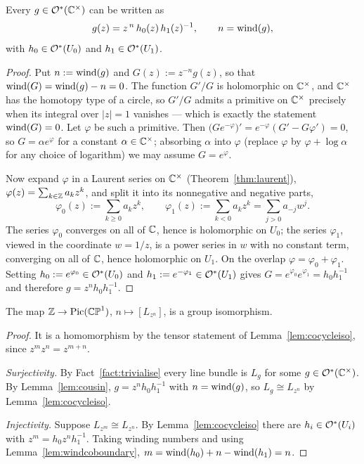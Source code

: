\begin{smjlemma}\label{lem:cousin}
Every $g \in \mathcal{O}^\ast(\mathbb{C}^\times)$ can be written as
\[
g(z) = z^{\,n}\, h_0(z)\, h_1(z)^{-1}, \qquad n = \operatorname{wind}(g),
\]
with $h_0 \in \mathcal{O}^\ast(U_0)$ and $h_1 \in \mathcal{O}^\ast(U_1)$.
\end{smjlemma}

\begin{proof}
Put $n := \operatorname{wind}(g)$ and $G(z) := z^{-n}g(z)$, so that $\operatorname{wind}(G) = \operatorname{wind}(g) - n =
0$. The function $G'/G$ is holomorphic on $\mathbb{C}^\times$, and $\mathbb{C}^\times$ has the
homotopy type of a circle, so $G'/G$ admits a primitive on $\mathbb{C}^\times$ precisely
when its integral over $|z| = 1$ vanishes \cite[Ch.~4]{Ahlfors} --- which is
exactly the statement $\operatorname{wind}(G) = 0$. Let $\varphi$ be such a primitive. Then
$\big(Ge^{-\varphi}\big)' = e^{-\varphi}(G' - G\varphi') = 0$, so
$G = \alpha e^{\varphi}$ for a constant $\alpha \in \mathbb{C}^\times$; absorbing
$\alpha$ into $\varphi$ (replace $\varphi$ by $\varphi + \log\alpha$ for any
choice of logarithm) we may assume $G = e^{\varphi}$.

Now expand $\varphi$ in a Laurent series on $\mathbb{C}^\times$
(Theorem~\ref{thm:laurent}), $\varphi(z) = \sum_{k \in \mathbb{Z}} a_k z^k$, and split
it into its nonnegative and negative parts,
\[
\varphi_0(z) := \sum_{k \geq 0} a_k z^{k}, \qquad
\varphi_1(z) := \sum_{k < 0} a_k z^{k} = \sum_{j > 0} a_{-j} w^{j} .
\]
The series $\varphi_0$ converges on all of $\mathbb{C}$, hence is holomorphic on $U_0$;
the series $\varphi_1$, viewed in the coordinate $w = 1/z$, is a power series in
$w$ with no constant term, converging on all of $\mathbb{C}$, hence holomorphic on
$U_1$. On the overlap $\varphi = \varphi_0 + \varphi_1$. Setting
$h_0 := e^{\varphi_0} \in \mathcal{O}^\ast(U_0)$ and
$h_1 := e^{-\varphi_1} \in \mathcal{O}^\ast(U_1)$ gives
$G = e^{\varphi_0}e^{\varphi_1} = h_0 h_1^{-1}$ and therefore
$g = z^n h_0 h_1^{-1}$.
\end{proof}

\begin{theorem}\label{thm:picZ}
The map $\mathbb{Z} \to \operatorname{Pic}(\mathbb{CP}^1)$, $n \mapsto [L_{z^n}]$, is a group isomorphism.
\end{theorem}

\begin{proof}
It is a homomorphism by the tensor statement of Lemma~\ref{lem:cocycleiso}, since
$z^{m}z^{n} = z^{m+n}$.

\emph{Surjectivity.} By Fact~\ref{fact:trivialise} every line bundle is $L_g$ for
some $g \in \mathcal{O}^\ast(\mathbb{C}^\times)$. By Lemma~\ref{lem:cousin},
$g = z^{n}h_0h_1^{-1}$ with $n = \operatorname{wind}(g)$, so $L_g \cong L_{z^n}$ by
Lemma~\ref{lem:cocycleiso}.

\emph{Injectivity.} Suppose $L_{z^m} \cong L_{z^n}$. By
Lemma~\ref{lem:cocycleiso} there are $h_i \in \mathcal{O}^\ast(U_i)$ with
$z^{m} = h_0 z^{n} h_1^{-1}$. Taking winding numbers and using
Lemma~\ref{lem:windcoboundary},
$m = \operatorname{wind}(h_0) + n - \operatorname{wind}(h_1) = n$.
\end{proof}


